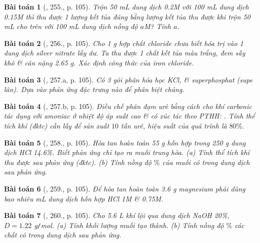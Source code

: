 \documentclass{article}
\newtheorem{baitoan}{Bài toán}
\begin{document}
\begin{baitoan}[\cite{Nguyen_Buu_Can_500_BT_Hoa_Hoc_THCS}, 255., p. 105]
	Trộn {\rm50 mL} dung dịch {\rm{} 0.2M} với {\rm100 mL} dung dịch {\rm{} 0.15M} thì thu được 1 lượng kết tủa đúng bằng lượng kết tủa thu được khi trộn {\rm50 mL } cho trên với {\rm100 mL} dung dịch {\rm{}} nồng độ $a${\rm M}? Tính $a$.
\end{baitoan}

\begin{baitoan}[\cite{Nguyen_Buu_Can_500_BT_Hoa_Hoc_THCS}, 256., p. 105]
	Cho {\rm1 g} hợp chất chloride chưa biết hóa trị vào 1 dung dịch silver nitrate lấy dư. Ta thu được 1 chất kết tủa màu trắng, đem sấy khô \& cân nặng {\rm2.65 g}. Xác định công thức của iron chloride.
\end{baitoan}

\begin{baitoan}[\cite{Nguyen_Buu_Can_500_BT_Hoa_Hoc_THCS}, 257.a, p. 105]
	Có 3 gói phân hóa học {\rm KCl, } \& superphosphat (supe lân). Dựa vào phản ứng đặc trưng nào để phân biệt chúng.
\end{baitoan}

\begin{baitoan}[\cite{Nguyen_Buu_Can_500_BT_Hoa_Hoc_THCS}, 257.b, p. 105]
	Điều chế phân đạm urê bằng cách cho khí carbonic tác dụng với amoniac {\rm{}} ở nhiệt độ áp suất cao \& có xúc tác theo {\rm PTHH}: {\rm{}}. Tính thể tích khí {\rm{}} (đktc) cần lấy để sản xuất $10$ tấn urê, hiệu suất của quá trình là $80\%$.
\end{baitoan}

\begin{baitoan}[\cite{Nguyen_Buu_Can_500_BT_Hoa_Hoc_THCS}, 258., p. 105]
	Hòa tan hoàn toàn {\rm55 g} hỗn hợp {\rm{}} trong {\rm250 g} dung dịch {\rm HCl 14.6\%}. Biết phản ứng chỉ tạo ra muối trung hòa. (a) Tính thể tích khí thu được sau phản ứng (đktc). (b) Tính nồng độ $\%$ của muối có trong dung dịch sau phản ứng.
\end{baitoan}

\begin{baitoan}[\cite{Nguyen_Buu_Can_500_BT_Hoa_Hoc_THCS}, 259., p. 105]
	Để hòa tan hoàn toàn {\rm3.6 g} magnesium phải dùng bao nhiêu {\rm mL} dung dịch hỗn hợp {\rm HCl 1M} \& {\rm{} 0.75M}.
\end{baitoan}

\begin{baitoan}[\cite{Nguyen_Buu_Can_500_BT_Hoa_Hoc_THCS}, 260., p. 105]
	Cho {\rm5.6 L} khí {\rm{}} lội qua dung dịch {\rm NaOH 20\%}, $D = 1.22$ {\rm g{\tt/}mol}. (a) Tính khối lượng muối tạo thành. (b) Tính nồng độ $\%$ các chất có trong dung dịch sau phản ứng.
\end{baitoan}
\end{document}
